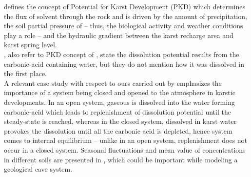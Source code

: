 \citet{mangin1975contribution} defines the concept of Potential for Karst Development (PKD) which determines the flux of solvent 
through the rock and is driven by the amount of precipitation, the soil partial pressure of  -- thus, the biological activity 
and weather conditions play a role -- and the hydraulic gradient between the karst recharge area and karst spring level. \\

\citet{mohammadi2007method}, also refer to PKD concept of \citet{mangin1975contribution}, state the dissolution potential results from 
the carbonic-acid containing water, but they do not mention how it was dissolved in the first place. \\

A relevant case study with respect to ours carried out by \citet{atkinson1977carbon} emphasizes the importance of a 
system being closed and opened to the atmosphere in karstic developments. In an open system, gaseous  is dissolved into the water 
forming carbonic-acid which leads to replenishment of dissolution potential until the steady-state 
is reached, whereas in the closed system, dissolved  in karst water provokes the dissolution until all the carbonic acid is depleted, 
hence system comes to internal equilibrium -- unlike in an open system, replenishment does not occur in a closed system. 
Seasonal fluctuations and mean value of  concentrations in different soils are presented in , 
which could be important while modeling a geological cave system. \\

